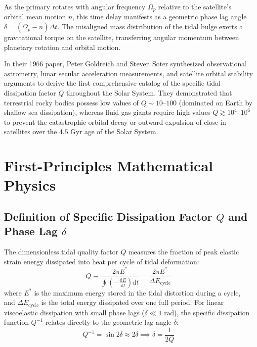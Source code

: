 \documentclass[11pt,a4paper]{article}
\begin{document}
As the primary rotates with angular frequency $\Omega_p$ relative to the satellite's orbital mean motion $n$, this time delay manifests as a geometric phase lag angle $\delta = (\Omega_p - n)\Delta t$. The misaligned mass distribution of the tidal bulge exerts a gravitational torque on the satellite, transferring angular momentum between planetary rotation and orbital motion.

In their 1966 paper, Peter Goldreich and Steven Soter synthesized observational astrometry, lunar secular acceleration measurements, and satellite orbital stability arguments to derive the first comprehensive catalog of the specific tidal dissipation factor $Q$ throughout the Solar System. They demonstrated that terrestrial rocky bodies possess low values of $Q \sim 10$--$100$ (dominated on Earth by shallow sea dissipation), whereas fluid gas giants require high values $Q \gtrsim 10^4$--$10^6$ to prevent the catastrophic orbital decay or outward expulsion of close-in satellites over the $4.5\text{ Gyr}$ age of the Solar System.

\section{First-Principles Mathematical Physics}

\subsection{Definition of Specific Dissipation Factor \texorpdfstring{$Q$}{Q} and Phase Lag \texorpdfstring{$\delta$}{delta}}
The dimensionless tidal quality factor $Q$ measures the fraction of peak elastic strain energy dissipated into heat per cycle of tidal deformation:
\begin{equation}
Q \equiv \frac{2\pi E^*}{\oint \left( -\frac{\mathrm{d}E}{\mathrm{d}t} \right) \mathrm{d}t} = \frac{2\pi E^*}{\Delta E_{\text{cycle}}}
\end{equation}
where $E^*$ is the maximum energy stored in the tidal distortion during a cycle, and $\Delta E_{\text{cycle}}$ is the total energy dissipated over one full period. For linear viscoelastic dissipation with small phase lags ($\delta \ll 1\text{ rad}$), the specific dissipation function $Q^{-1}$ relates directly to the geometric lag angle $\delta$:
\begin{equation}
Q^{-1} = \sin 2\delta \approx 2\delta \implies \delta = \frac{1}{2Q}
\end{equation}
\end{document}
